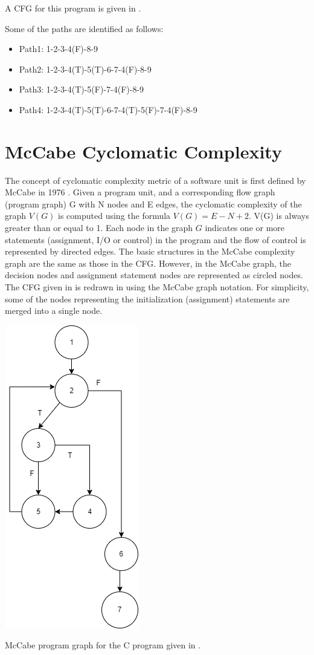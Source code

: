 A CFG for this program is given in .

Some of the paths are identified as follows:
\begin{itemize}
    \item Path1: 1-2-3-4(F)-8-9
    \item Path2: 1-2-3-4(T)-5(T)-6-7-4(F)-8-9
    \item Path3: 1-2-3-4(T)-5(F)-7-4(F)-8-9
    \item Path4: 1-2-3-4(T)-5(T)-6-7-4(T)-5(F)-7-4(F)-8-9
\end{itemize}

\section{McCabe Cyclomatic Complexity}
The concept of cyclomatic complexity metric of a software unit is first defined by McCabe in 1976 \autocite{mccabe1976complexity}. Given a program unit, and a corresponding flow graph (program graph) G with N nodes and E edges, the cyclomatic complexity of the graph $V(G)$ is computed using the formula $V(G) = E - N + 2$. V(G) is always greater than or equal to 1. Each node in the graph $G$ indicates one or more statements (assignment, I/O or control) in the program and the flow of control is represented by directed edges. The basic structures in the McCabe complexity graph are the same as those in the CFG. However, in the McCabe graph, the decision nodes and assignment statement nodes are represented as circled nodes. The CFG given in  is redrawn in  using the McCabe graph notation. For simplicity, some of the nodes representing the initialization (assignment) statements are merged into a single node.

\begin{marginfigure}[-4cm]
    \includegraphics{images/cfg-34.png}
    \caption{McCabe program graph for the C program given in .}
\end{marginfigure}

